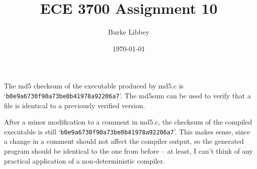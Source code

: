 \documentclass[10pt,letterpaper]{article}
\begin{document}
\author{Burke Libbey}
\date{\today}
\title{ECE 3700 Assignment 10}
\maketitle

The md5 checksum of the executable produced by md5.c is \\
`\texttt{b0e9a6730f90a73be0b41978a92206a7}'. The md5sum can be used to verify that a file is identical to a previously verified version. 

After a minor modification to a comment in md5.c, the checksum of the compiled executable is still `\texttt{b0e9a6730f90a73be0b41978a92206a7}'. This makes sense, since a change in a comment should not affect the compiler output, so the generated program should be identical to the one from before -- at least, I can't think of any practical application of a non-deterministic compiler.
\end{document}
